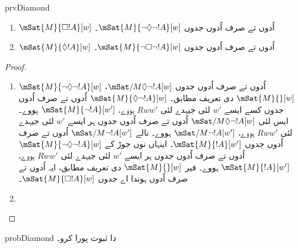 \documentclass[../../../include/open-logic-section]{subfiles}
\begin{document}
\begin{tagblock}{prvDiamond}
\begin{prop}
  \begin{enumerate}
  \item $\mSat{M}{\Box !A}[w]$ اُدوں تے صرف اُدوں جدوں $\mSat{M}{\lnot\Diamond\lnot !A}[w]$۔
  \item $\mSat{M}{\Diamond !A}[w]$ اُدوں تے صرف اُدوں جدوں $\mSat{M}{\lnot\Box\lnot !A}[w]$۔
  \end{enumerate}
\end{prop}

\begin{proof}
  \begin{enumerate}
    \item $\mSat{M}{\lnot\Diamond\lnot !A}[w]$ اُدوں تے صرف اُدوں جدوں $\mSat/{M}{\Diamond\lnot
      !A}[w]$، $\mSat{M}{}[w]$ دی تعریف مطابق۔ $\mSat{M}{\Diamond\lnot
      !A}[w]$ اُدوں تے صرف اُدوں جدوں کسے ایسے $w'$ لئی جیہدے لئی $Rww'$ ہووے، $\mSat{M}{\lnot
      !A}[w']$ ہووے۔ ایس لئی $\mSat/{M}{\Diamond\lnot !A}[w]$ اُدوں تے صرف اُدوں جدوں ہر ایسے
    $w'$ لئی جیہدے لئی $Rww'$ ہووے، $\mSat/{M}{\lnot !A}[w']$ ہووے۔ نالے
    $\mSat/{M}{\lnot !A}[w']$ اُدوں تے صرف اُدوں جدوں $\mSat{M}{!A}[w']$۔ اینہاں نوں جوڑ کے
    $\mSat{M}{\lnot\Diamond\lnot !A}[w]$ اُدوں تے صرف اُدوں جدوں ہر ایسے $w'$ لئی جیہدے لئی $Rww'$ ہووے،
    $\mSat{M}{!A}[w']$ ہووے۔ فیر $\mSat{M}{}[w]$ دی تعریف مطابق، ایہ اُدوں تے صرف اُدوں ہوندا اے جدوں $\mSat{M}{\Box !A}[w]$۔
    \item {}
  \end{enumerate}
\end{proof}

\begin{probtag}{probDiamond}
   دا ثبوت پورا کرو۔
\end{probtag}
\end{tagblock}
\end{document}
